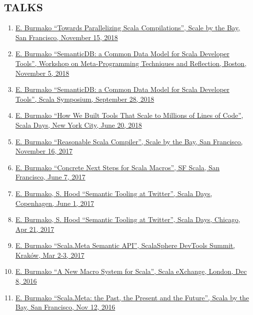 \documentclass[margin, 10pt]{Stylesheet}
\begin{document}
\begin{resume}
\section{TALKS}

\begin{enumerate} \itemsep -2pt
\item \href{https://github.com/twitter/rsc/raw/master/docs/2018-11-15-ScaleByTheBay.pdf}{E. Burmako ``Towards Parallelizing Scala Compilations'', Scale by the Bay, San Francisco, November 15, 2018}
\item \href{https://2018.splashcon.org/track/meta-2018#About}{E. Burmako ``SemanticDB: a Common Data Model for Scala Developer Tools'', Workshop on Meta-Programming Techniques and Reflection, Boston, November 5, 2018}
\item \href{https://conf.researchr.org/track/scala-2018/scala-2018-papers#About}{E. Burmako ``SemanticDB: a Common Data Model for Scala Developer Tools'', Scala Symposium, September 28, 2018}
\item \href{http://scalameta.org/talks/2018-06-20-HowWeBuiltToolsThatScaleToMillionsOfLoc.pdf}{E. Burmako ``How We Built Tools That Scale to Millions of Lines of Code'', Scala Days, New York City, June 20, 2018}
\item \href{https://github.com/twitter/rsc/raw/master/docs/2017-11-16-ScaleByTheBay.pdf}{E. Burmako ``Reasonable Scala Compiler'', Scale by the Bay, San Francisco, November 16, 2017}
\item \href{http://scalamacros.org/paperstalks/2017-06-07-ConcreteNextSteps.pdf}{E. Burmako ``Concrete Next Steps for Scala Macros'', SF Scala, San Francisco, June 7, 2017}
\item \href{http://scalameta.org/talks/2017-06-01-SemanticToolingAtTwitter.pdf}{E. Burmako, S. Hood ``Semantic Tooling at Twitter'', Scala Days, Copenhagen, June 1, 2017}
\item \href{http://scalameta.org/talks/2017-06-01-SemanticToolingAtTwitter.pdf}{E. Burmako, S. Hood ``Semantic Tooling at Twitter'', Scala Days, Chicago, Apr 21, 2017}
\item \href{http://scalamacros.org/paperstalks/2017-03-02-ScalaSphere.pdf}{E. Burmako ``Scala.Meta Semantic API'', ScalaSphere DevTools Summit, Krak\'{o}w, Mar 2-3, 2017}
\item \href{http://scalamacros.org/paperstalks/2016-12-08-Scalax.pdf}{E. Burmako ``A New Macro System for Scala'', Scala eXchange, London, Dec 8, 2016}
\item \href{http://scalamacros.org/paperstalks/2016-11-12-ScalaByTheBay.pdf}{E. Burmako ``Scala.Meta: the Past, the Present and the Future'', Scala by the Bay, San Francisco, Nov 12, 2016}

\end{enumerate}
\end{resume}
\end{document}
